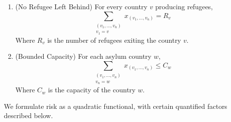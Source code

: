 \documentclass{article}
\begin{document}
\begin{enumerate}
    \item (No Refugee Left Behind) For every country $v$ producing refugees,
    \[ \sum_{\substack{(v_1, \dots, v_n) \\ v_1 = v}} x_{(v_1, \dots, v_n)} = R_v \]
    Where $R_v$ is the number of refugees exiting the country $v$.

    \item (Bounded Capacity) For each asylum country $w$,
    \[ \sum_{\substack{(v_1, \dots, v_n) \\ v_n = w}} x_{(v_1, \dots, v_n)} \leq C_w \]
    Where $C_w$ is the capacity of the country $w$.
\end{enumerate}

We formulate risk as a quadratic functional, with certain quantified factors described below.
\end{document}
